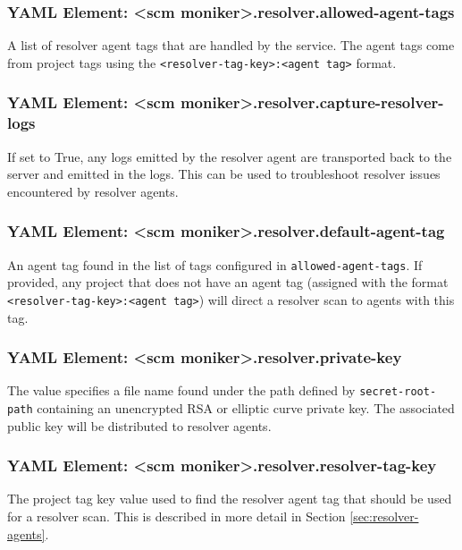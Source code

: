 \subsubsection{YAML Element: <scm moniker>.resolver.allowed-agent-tags}\label{sec:yaml-resolver-allowed-agent-tags}
A list of resolver agent tags that are handled by the \cxoneflow service.  The agent tags come from
\cxone project tags using the \texttt{<resolver-tag-key>:<agent tag>} format.  

\subsubsection{YAML Element: <scm moniker>.resolver.capture-resolver-logs}\label{sec:yaml-resolver-capture-resolver-logs}
If set to True, any logs emitted by the resolver agent are transported back to the \cxoneflow server and
emitted in the \cxoneflow logs.  This can be used to troubleshoot resolver issues encountered by resolver
agents.

\subsubsection{YAML Element: <scm moniker>.resolver.default-agent-tag}\label{sec:yaml-resolver-default-agent-tag}
An agent tag found in the list of tags configured in \texttt{allowed-agent-tags}.  If provided,
any \cxone project that does not have an agent tag (assigned with the format \texttt{<resolver-tag-key>:<agent tag>})
will direct a resolver scan to agents with this tag.

\subsubsection{YAML Element: <scm moniker>.resolver.private-key}\label{sec:yaml-resolver-private-key}
The value specifies a file name found under the path defined by \texttt{secret-root-path}
containing an unencrypted RSA or elliptic curve private key.  The associated public key will be distributed to
resolver agents.

\subsubsection{YAML Element: <scm moniker>.resolver.resolver-tag-key}\label{sec:yaml-resolver-resolver-tag-key}
The \cxone project tag key value used to find the resolver agent tag that should be used for a resolver scan.
This is described in more detail in Section \ref{sec:resolver-agents}.

